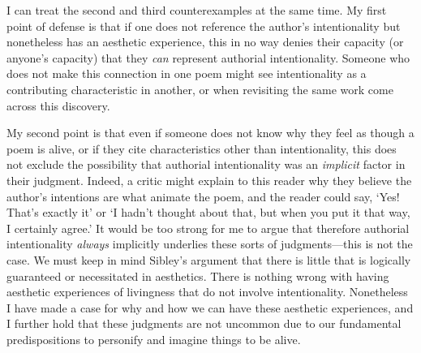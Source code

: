 I can treat the second and third counterexamples at the same time. My
first point of defense is that if one does not reference the author's
intentionality but nonetheless has an aesthetic experience, this in no
way denies their capacity (or anyone's capacity) that they \emph{can}
represent authorial intentionality. Someone who does not make this
connection in one poem might see intentionality as a contributing
characteristic in another, or when revisiting the same work come across
this discovery.

My second point is that even if someone does not know why they feel as
though a poem is alive, or if they cite characteristics other than
intentionality, this does not exclude the possibility that authorial
intentionality was an \emph{implicit} factor in their judgment. Indeed,
a critic might explain to this reader why they believe the author's
intentions are what animate the poem, and the reader could say, `Yes!
That's exactly it' or `I hadn't thought about that, but when you put it
that way, I certainly agree.' It would be too strong for me to argue
that therefore authorial intentionality \emph{always} implicitly
underlies these sorts of judgments---this is not the case. We must keep
in mind Sibley's argument that there is little that is logically
guaranteed or necessitated in aesthetics. There is nothing wrong with
having aesthetic experiences of livingness that do not involve
intentionality. Nonetheless I have made a case for why and how we can
have these aesthetic experiences, and I further hold that these
judgments are not uncommon due to our fundamental predispositions to
personify and imagine things to be alive.

